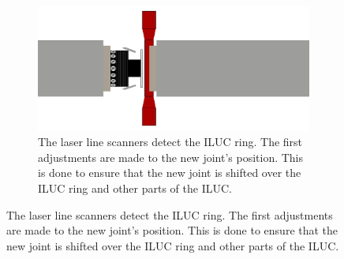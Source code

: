 \begin{figure}[H]
\begin{subfigure}{0.7\textwidth}
    \end{subfigure}
    \begin{subfigure}{0.7\textwidth}
        \includegraphics[width=\textwidth ]{images/lua_oop_ILUC_ring.png}
        \caption{The laser line scanners detect the ILUC ring. The first adjustments are made to the new joint's position.
            This is done to ensure that the new joint is shifted over the ILUC ring and other parts of the ILUC.}
        \label{fig:oop_ILUC_ring}
    \end{subfigure}
\end{figure}
